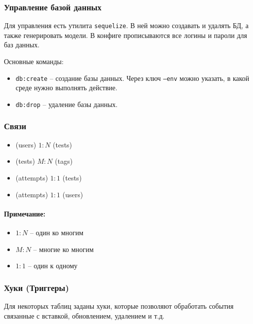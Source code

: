 \subsubsection{Управление базой данных}
Для управления есть утилита \texttt{sequelize}. В ней можно создавать и удалять БД, а также генерировать модели. В конфиге прописываются все логины и пароли для баз данных.

Основные команды:
\begin{itemize}
    \item \texttt{db:create} -- создание базы данных. Через ключ \texttt{--env} можно указать, в какой среде нужно выполнять действие.
    \item \texttt{db:drop} -- удаление базы данных.
\end{itemize}

\subsubsection{Связи}
\begin{itemize}
    \item (users) $1:N$ (tests)
    \item (tests) $M:N$ (tags)
    \item (attempts) $1:1$ (tests)
    \item (attempts) $1:1$ (users)
\end{itemize}
\paragraph{Примечание:}

\begin{itemize}
    \item $1:N$ -- один ко многим
    \item $M:N$ -- многие ко многим
    \item $1:1$ -- один к одному
\end{itemize}

\subsubsection{Хуки (Триггеры)}
Для некоторых таблиц заданы хуки, которые позволяют обработать события связанные с вставкой, обновлением, удалением и т.д.

